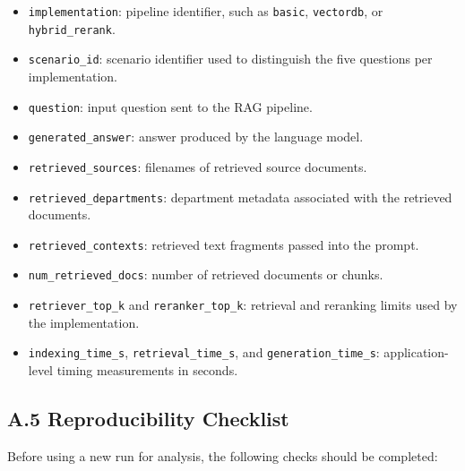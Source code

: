 \begin{itemize}
    \item \texttt{implementation}: pipeline identifier, such as \texttt{basic}, \texttt{vectordb}, or \texttt{hybrid\_rerank}.
    \item \texttt{scenario\_id}: scenario identifier used to distinguish the five questions per implementation.
    \item \texttt{question}: input question sent to the \ac{RAG} pipeline.
    \item \texttt{generated\_answer}: answer produced by the language model.
    \item \texttt{retrieved\_sources}: filenames of retrieved source documents.
    \item \texttt{retrieved\_departments}: department metadata associated with the retrieved documents.
    \item \texttt{retrieved\_contexts}: retrieved text fragments passed into the prompt.
    \item \texttt{num\_retrieved\_docs}: number of retrieved documents or chunks.
    \item \texttt{retriever\_top\_k} and \texttt{reranker\_top\_k}: retrieval and reranking limits used by the implementation.
    \item \texttt{indexing\_time\_s}, \texttt{retrieval\_time\_s}, and \texttt{generation\_time\_s}: application-level timing measurements in seconds.
\end{itemize}

\subsection*{A.5 Reproducibility Checklist}

Before using a new run for analysis, the following checks should be completed:

